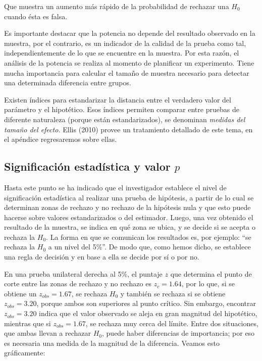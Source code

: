\documentclass[]{book}
\begin{document}
Que muestra un aumento más rápido de la probabilidad de rechazar una
\(H_0\) cuando ésta es falsa.

Es importante destacar que la potencia no depende del resultado
observado en la muestra, por el contrario, es un indicador de la calidad
de la prueba como tal, independientemente de lo que se encuentre en la
muestra. Por esta razón, el análisis de la potencia se realiza al
momento de planificar un experimento. Tiene mucha importancia para
calcular el tamaño de muestra necesario para detectar una determinada
diferencia entre grupos.

Existen índices para estandarizar la distancia entre el verdadero valor
del parámetro y el hipotético. Esos índices permiten comparar entre
pruebas de diferente naturaleza (porque están estandarizados), se
denominan \emph{medidas del tamaño del efecto.} Ellis (2010) provee un
tratamiento detallado de este tema, en el apéndice regresaremos sobre
ellas.

\hypertarget{significaciuxf3n-estaduxedstica-y-valor-p}{%
\subsection{\texorpdfstring{Significación estadística y valor \(p\)}{Significación estadística y valor p}}\label{significaciuxf3n-estaduxedstica-y-valor-p}}

Hasta este punto se ha indicado que el investigador establece el nivel
de significación estadística al realizar una prueba de hipótesis, a
partir de lo cual se determinan zonas de rechazo y no rechazo de la
hipótesis nula y que esto puede hacerse sobre valores estandarizados o
del estimador. Luego, una vez obtenido el resultado de la muestra, se
indica en qué zona se ubica, y se decide si se acepta o rechaza la \(H_{0}\).
La forma en que se comunican los resultados es, por ejemplo: ``se rechaza
la \(H_{0}\) a un nivel del 5\%''. De modo que, como hemos dicho, se establece
una regla de decisión y en base a ella se decide por sí o por no.

En una prueba unilateral derecha al 5\%, el puntaje \(z\) que determina el
punto de corte entre las zonas de rechazo y no rechazo es \(z_{c}=1.64\), por lo que, si se obtiene un \(z_{obs}= 1.67\), se rechaza
\(H_{0}\) y también se rechaza si se obtiene \(z_{obs}= 3.20\), porque ambos son
superiores al punto crítico. Sin embargo, encontrar \(z_{obs}= 3.20\) indica que
el valor observado se aleja en gran magnitud del hipotético, mientras
que si \(z_{obs}= 1.67\), se rechaza muy cerca del límite. Entre dos situaciones,
que ambas llevan a rechazar \(H_{0}\), puede haber diferencias de
importancia; por eso es necesaria una medida de la magnitud de la
diferencia. Veamos esto gráficamente:
\end{document}
